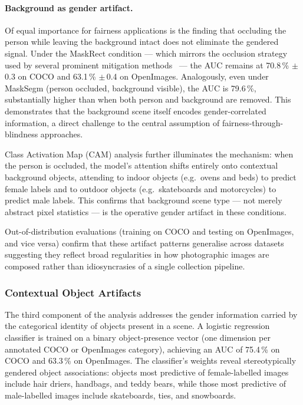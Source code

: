 \paragraph{Background as gender artifact.}
Of equal importance for fairness applications is the finding that occluding the person while
leaving the background intact does not eliminate the gendered signal.  Under the MaskRect
condition --- which mirrors the occlusion strategy used by several prominent mitigation
methods~\cite{Hendricks_2018_WomenAlsoSnowboard,Wang_2019_BalancedDatasets} --- the AUC
remains at 70.8\,\% $\pm$\,0.3 on COCO and 63.1\,\% $\pm$\,0.4 on OpenImages.  Analogously,
even under MaskSegm (person occluded, background visible), the AUC is 79.6\,\%,
substantially higher than when both person and background are removed.  This demonstrates
that the background scene itself encodes gender-correlated information, a direct challenge to
the central assumption of fairness-through-blindness approaches.

Class Activation Map (CAM) analysis further illuminates the mechanism: when the person is
occluded, the model's attention shifts entirely onto contextual background objects, attending
to indoor objects (e.g.\ ovens and beds) to predict female labels and to outdoor objects
(e.g.\ skateboards and motorcycles) to predict male labels.  This confirms that background
scene type --- not merely abstract pixel statistics --- is the operative gender artifact in
these conditions.

Out-of-distribution evaluations (training on COCO and testing on OpenImages, and vice versa)
confirm that these artifact patterns generalise across datasets suggesting they reflect broad regularities in how photographic images are composed rather than idiosyncrasies of a single collection pipeline.

\subsubsection*{Contextual Object Artifacts}

The third component of the analysis addresses the gender information carried by the
categorical identity of objects present in a scene.  A logistic regression classifier is
trained on a binary object-presence vector (one dimension per annotated COCO or OpenImages
category), achieving an AUC of 75.4\,\% on COCO and 63.3\,\% on OpenImages.  The
classifier's weights reveal stereotypically gendered object associations: objects most
predictive of female-labelled images include hair driers, handbags, and teddy bears, while
those most predictive of male-labelled images include skateboards, ties, and snowboards.

